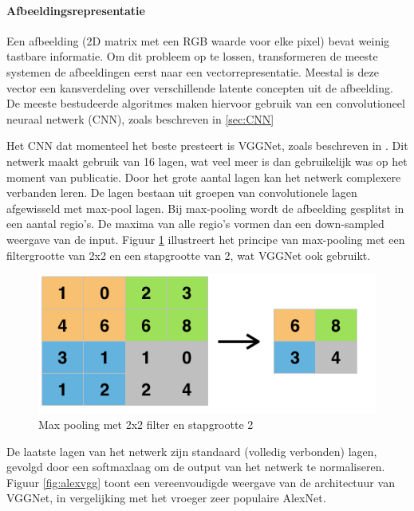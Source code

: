 \paragraph{Afbeeldingsrepresentatie}

Een afbeelding (2D matrix met een RGB waarde voor elke pixel) bevat weinig tastbare informatie. Om dit probleem op te lossen, transformeren de meeste systemen de afbeeldingen eerst naar een vectorrepresentatie. Meestal is deze vector een kansverdeling over verschillende latente concepten uit de afbeelding. De meeste bestudeerde algoritmes maken hiervoor gebruik van een convolutioneel neuraal netwerk (CNN), zoals beschreven in \ref{sec:CNN}

Het CNN dat momenteel het beste presteert is VGGNet, zoals beschreven in \cite{Arge2015}. Dit netwerk maakt gebruik van 16 lagen, wat veel meer is dan gebruikelijk was op het moment van publicatie. Door het grote aantal lagen kan het netwerk complexere verbanden leren. De lagen bestaan uit groepen van convolutionele lagen afgewisseld met max-pool lagen. Bij max-pooling wordt de afbeelding gesplitst in een aantal regio's. De maxima van alle regio's vormen dan een down-sampled weergave van de input. Figuur \ref{fig:maxpool}  illustreert het principe van max-pooling met een filtergrootte van 2x2 en een stapgrootte van 2, wat VGGNet ook gebruikt.

\begin{figure}[tb]
    \centering
    \includegraphics[width=0.6\linewidth]{Images/maxpool.png}
    \caption{Max pooling met 2x2 filter en stapgrootte 2}
    \label{fig:maxpool}
\end{figure}

De laatste lagen van het netwerk zijn standaard (volledig verbonden) lagen, gevolgd door een softmaxlaag om de output van het netwerk te normaliseren. Figuur \ref{fig:alexvgg} toont een vereenvoudigde weergave van de architectuur van VGGNet, in vergelijking met het vroeger zeer populaire AlexNet\cite{Krizhevsky2012a}.

